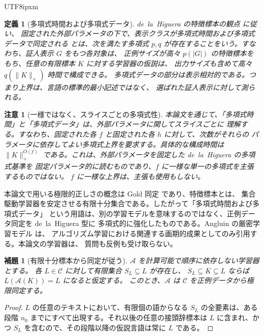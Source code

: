 \documentclass[10pt,a4paper]{article}
\newtheorem{lemma}[theorem]{補題}
\newtheorem{definition}[theorem]{定義}
\newtheorem{remark}[theorem]{注意}
\theoremstyle{remark}
\begin{document}
\begin{CJK}{UTF8}{ipxm}
\begin{definition}[多項式時間および多項式データ]
\label{def:poly-time-data}
de~la~Higuera の特徴標本の観点 \cite{delaHiguera1997,delaHiguera2010} に従い、
固定された外部パラメータの下で、表示クラスが\emph{多項式時間および多項式データで同定される}
とは、次を満たす多項式 \(p,q\) が存在することをいう。すなわち、証人表示 \(G\) をもつ各対象は、
正例サイズが高々 \(p(|G|)\) の特徴標本をもち、任意の有限標本 \(K\) に対する学習器の仮説は、
出力サイズも含めて高々 \(q(\|K\|_+)\) 時間で構成できる。
多項式データの部分は表示相対的である。つまり上界は、言語の標準的最小記述ではなく、
選ばれた証人表示に対して測られる。
\end{definition}

\begin{remark}[一様ではなく、スライスごとの多項式性]
\label{rem:slicewise-poly}
本論文を通じて、「多項式時間」と「多項式データ」は、外部パラメータに関してスライスごとに
理解する。すなわち、固定された各 \(f\) と固定された各 \(h\) に対して、次数がそれらの
パラメータに依存してよい多項式上界を要求する。具体的な構成時間は
\(\|K\|_+^{O(f)}\) である。これは、外部パラメータを固定した de~la~Higuera の多項式基準を
固定パラメータ的に読むものであり、\(f\) に一様な単一の多項式を主張するものではない。
\(f\) に一様な上界は、主張も使用もしない。
\end{remark}

本論文で用いる極限的正しさの概念は Gold 同定 \cite{Gold1967} であり、特徴標本とは、
集合駆動学習器を安定させる有限十分集合である。したがって「多項式時間および多項式データ」
という用語は、別の学習モデルを意味するのではなく、正例データ同定を de~la~Higuera 型に
多項式的に強化したものである。Angluin の厳密学習モデル \cite{Angluin1987} は、
アルゴリズム学習における関連する画期的成果としてのみ引用する。本論文の学習器は、
質問も反例も受け取らない。

\begin{lemma}[有限十分標本から同定が従う]
\label{lem:sufficient-to-gold}
\(\mathcal A\) を計算可能で順序に依存しない学習器とする。
各 \(L\in\mathcal C\) に対して有限集合 \(S_L\subseteq L\) が存在し、
\(S_L\subseteq K\subseteq L\) ならば \(L(\mathcal A(K))=L\) になると仮定する。
このとき、\(\mathcal A\) は \(\mathcal C\) を正例データから極限同定する。
\end{lemma}

\begin{proof}
\(L\) の任意のテキストにおいて、有限個の語からなる \(S_L\) の全要素は、ある段階
\(n_0\) までにすべて出現する。それ以後の任意の接頭辞標本は \(L\) に含まれ、かつ
\(S_L\) を含むので、その段階以降の仮説言語は常に \(L\) である。
\end{proof}


\end{CJK}
\end{document}
